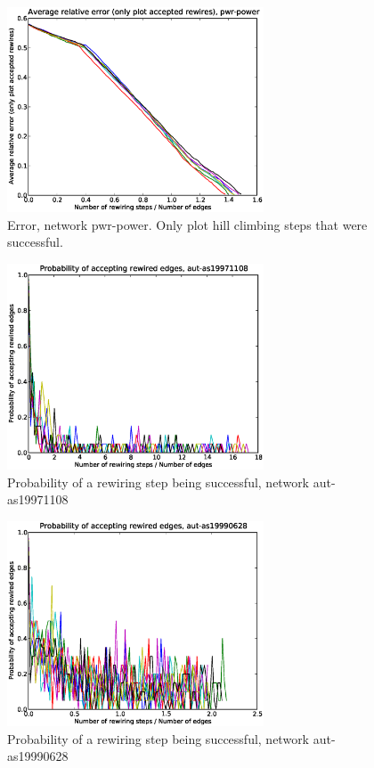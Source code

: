 \begin{figure}[p]
\centering
\includegraphics[width=3in]{Figures/acceptedOnly-pwr-power.eps}
\caption{Error, network pwr-power.  Only plot hill climbing steps that were successful.}
\label{fig:errors-pwr-power}
\end{figure}

\begin{figure}[p]
\centering
\includegraphics[width=3in]{Figures/Paccept-aut-as19971108.eps}
\caption{Probability of a rewiring step being successful, network aut-as19971108}
\label{fig:Paccept-aut-as19971108}
\end{figure}

\begin{figure}[p]
\centering
\includegraphics[width=3in]{Figures/Paccept-aut-as19990628.eps}
\caption{Probability of a rewiring step being successful, network aut-as19990628}
\label{fig:Paccept-aut-as19990628}
\end{figure}

